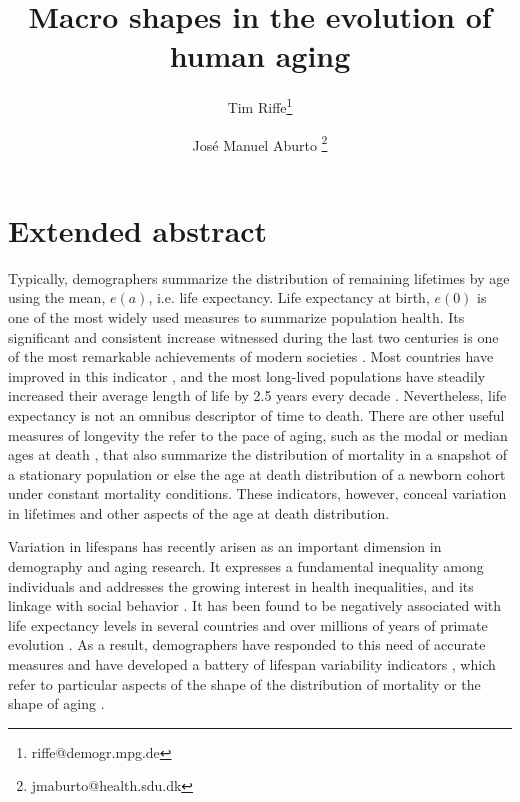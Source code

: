 \documentclass{article}
\begin{document}
\title{Macro shapes in the evolution of human aging}

\author[1]{Tim Riffe\thanks{riffe@demogr.mpg.de}}
\author[2,3]{Jos\'e Manuel Aburto \thanks{jmaburto@health.sdu.dk}}

\maketitle

\begin{abstract}

\end{abstract}

\section*{Extended abstract}

\doublespacing

Typically, demographers summarize the distribution of remaining
lifetimes by age using the mean, $e(a)$, i.e. life expectancy. Life expectancy at birth, $e(0)$ is one of the most widely used measures to
summarize population health. Its significant and consistent increase witnessed during the last two centuries is one of the most remarkable achievements of modern societies \citep{oeppen2002broken}. Most countries have improved in this indicator \citep{world2016world}, and the most long-lived populations have steadily increased their average length of life by 2.5 years every decade \citep{oeppen2002broken}. Nevertheless, life
expectancy is not an omnibus descriptor of time to death. There are other
useful measures of longevity the refer to the pace of aging, such as the modal or median ages at death \citep{canudas2010three}, that also summarize the distribution of mortality in a snapshot of a stationary population or else the age at death distribution of a newborn cohort under constant mortality
conditions. These indicators, however, conceal variation in lifetimes and other aspects of the age at death distribution. 

Variation in lifespans has recently arisen as an important dimension in demography and aging research. It expresses a fundamental inequality among individuals and addresses the growing interest in health inequalities, and its linkage with social behavior \citep{mackenbach2012persistence}. It has been found to be negatively associated with life expectancy levels in several countries and over millions of years of primate evolution \citep{vaupel2011life, colchero2016emergence}. As a result, demographers have responded to this need of accurate measures and have developed a battery of lifespan variability indicators \citep{van2013perturbation}, which refer to particular aspects of the shape of the distribution of mortality or the shape of aging \citep{wrycza2015quantifying}. 
\end{document}
